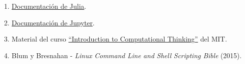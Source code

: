 \documentclass[a4paper]{article}
\begin{document}
\begin{enumerate}

    \item \href{https://docs.julialang.org/en/v1/}{Documentación de Julia}.

    \item \href{https://docs.jupyter.org/en/latest/}{Documentación de Jupyter}.

    \item Material del curso \href{https://computationalthinking.mit.edu/Spring21/}{``Introduction to Computational Thinking''} del MIT.

    \item Blum y Bresnahan - \emph{Linux Command Line and Shell Scripting Bible} (2015).
\end{enumerate}
\end{document}
